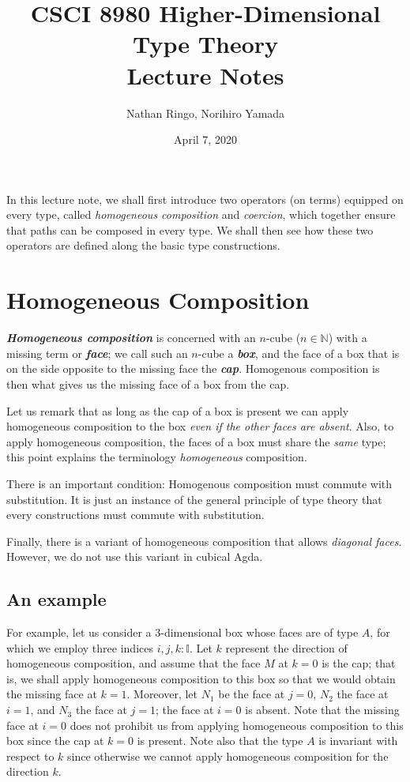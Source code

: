 \documentclass[11pt]{article}
\title{CSCI 8980 Higher-Dimensional Type Theory\\ Lecture Notes}
\author{Nathan Ringo, Norihiro Yamada}
\date{April 7, 2020} %
\begin{document}
\maketitle

In this lecture note, we shall first introduce two operators (on terms) equipped on every type, called \emph{homogeneous composition} and \emph{coercion}, which together ensure that paths can be composed in every type. 
We shall then see how these two operators are defined along the basic type constructions. 


\section{Homogeneous Composition}
\label{HomogeneousComposition}
\emph{\bfseries Homogeneous composition} is concerned with an $n$-cube ($n \in \mathbb{N}$) with a missing term or \emph{\bfseries face}; we call such an $n$-cube a \emph{\bfseries box}, and the face of a box that is on the side opposite to the missing face the \emph{\bfseries cap}. 
Homogenous composition is then what gives us the missing face of a box from the cap.

Let us remark that as long as the cap of a box is present we can apply homogeneous composition to the box \emph{even if the other faces are absent}.
Also, to apply homogeneous composition, the faces of a box must share the \emph{same} type; this point explains the terminology \emph{homogeneous} composition. 

There is an important condition: Homogenous composition must commute with substitution. 
It is just an instance of the general principle of type theory that every constructions must commute with substitution. 

Finally, there is a variant of homogeneous composition that allows \emph{diagonal faces}.
However, we do not use this variant in cubical Agda.





\subsection{An example}
For example, let us consider a 3-dimensional box whose faces are of type $A$, for which we employ three indices $i, j, k : \mathbb{I}$.
Let $k$ represent the direction of homogeneous composition, and assume that the face $M$ at $k = 0$ is the cap; that is, we shall apply homogeneous composition to this box so that we would obtain the missing face at $k = 1$.
Moreover, let $N_1$ be the face at $j = 0$, $N_2$ the face at $i = 1$, and $N_3$ the face at $j = 1$; the face at $i = 0$ is absent.  
Note that the missing face at $i = 0$ does not prohibit us from applying homogeneous composition to this box since the cap at $k = 0$ is present. 
Note also that the type $A$ is invariant with respect to $k$ since otherwise we cannot apply homogeneous composition for the direction $k$. 
\end{document}
